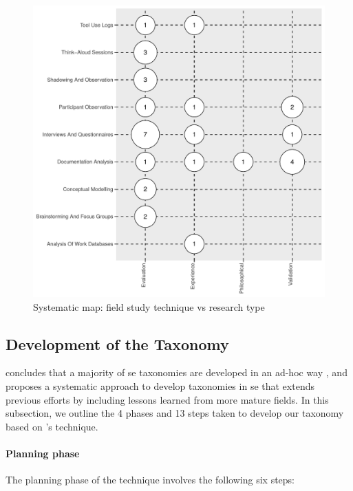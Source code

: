 \begin{figure}
  \centering
  \includegraphics[width=.55\linewidth]{sms}
  \caption[A systematic map of API documentation knowledge studies]{Systematic map: field study technique vs research type}
  \label{esem2019:figsms}
\end{figure}

\subsection{Development of the Taxonomy}
\label{esem2019:sec:method:taxonomy-development}

\citeauthor{Usman:2017hn} concludes that a majority of \gls{se} taxonomies are developed in an ad-hoc way \citep{Usman:2017hn}, and proposes a systematic approach to develop taxonomies in \gls{se} that extends previous efforts by including lessons learned from more mature fields. In this subsection, we outline the 4 phases and 13 steps taken to develop our taxonomy based on \citeauthor{Usman:2017hn}'s technique.

\paragraph{Planning phase} The planning phase of the technique involves the following six steps:

